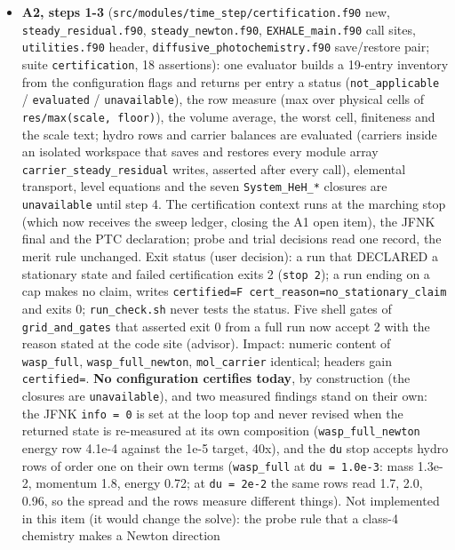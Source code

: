 \documentclass[english,a4paper]{my_memo}
\begin{document}
\begin{itemize}
\item
  \textbf{A2, steps 1-3} (\texttt{src/modules/time\_step/certification.f90} new,
  \texttt{steady\_residual.f90}, \texttt{steady\_newton.f90}, \texttt{EXHALE\_main.f90} call sites,
  \texttt{utilities.f90} header, \texttt{diffusive\_photochemistry.f90} save/restore pair;
  suite \texttt{certification}, 18 assertions): one evaluator builds a 19-entry
  inventory from the configuration flags and returns per entry a status
  (\texttt{not\_applicable} / \texttt{evaluated} / \texttt{unavailable}), the row measure (max
  over physical cells of \texttt{\textbar{}res\textbar{}/max(scale,\ floor)}), the volume average,
  the worst cell, finiteness and the scale text; hydro rows and carrier
  balances are evaluated (carriers inside an isolated workspace that saves
  and restores every module array \texttt{carrier\_steady\_residual} writes,
  asserted after every call), elemental transport, level equations and
  the seven \texttt{System\_HeH\_*} closures are \texttt{unavailable} until step 4. The
  certification context runs at the marching stop (which now receives the
  sweep ledger, closing the A1 open item), the JFNK final and the PTC
  declaration; probe and trial decisions read one record, the merit rule
  unchanged. Exit status (user decision): a run that DECLARED a stationary
  state and failed certification exits 2 (\texttt{stop\ 2}); a run ending on a cap
  makes no claim, writes \texttt{certified=F\ cert\_reason=no\_stationary\_claim} and
  exits 0; \texttt{run\_check.sh} never tests the status. Five shell gates of
  \texttt{grid\_and\_gates} that asserted exit 0 from a full run now accept 2 with
  the reason stated at the code site (advisor). Impact: numeric content of
  \texttt{wasp\_full}, \texttt{wasp\_full\_newton}, \texttt{mol\_carrier} identical; headers gain
  \texttt{certified=}. \textbf{No configuration certifies today}, by construction (the
  closures are \texttt{unavailable}), and two measured findings stand on their
  own: the JFNK \texttt{info\ =\ 0} is set at the loop top and never revised when the
  returned state is re-measured at its own composition (\texttt{wasp\_full\_newton}
  energy row 4.1e-4 against the 1e-5 target, 40x), and the \texttt{du} stop
  accepts hydro rows of order one on their own terms (\texttt{wasp\_full} at
  \texttt{du\ =\ 1.0e-3}: mass 1.3e-2, momentum 1.8, energy 0.72; at \texttt{du\ =\ 2e-2}
  the same rows read 1.7, 2.0, 0.96, so the spread and the rows measure
  different things). Not implemented in this item (it would change the
  solve): the probe rule that a class-4 chemistry makes a Newton direction

\end{itemize}
\end{document}
